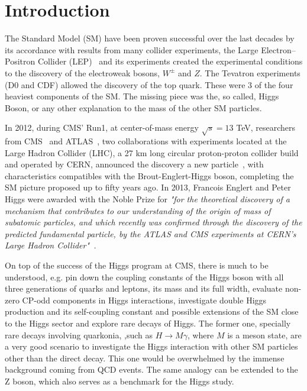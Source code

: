 \chapter{Introduction}

The Standard Model (SM) have been proven successful over the last decades by its accordance with results from many collider experiments, the Large Electron–Positron Collider (LEP)~\cite{lep_tdr} and its experiments created the experimental conditions to the discovery of the electroweak bosons, $W^{\pm}$ and $Z$. The Tevatron experiments (D0 and CDF) allowed the discovery of the top quark. These were 3 of the four heaviest components of the SM. The missing piece was the, so called, Higgs Boson, or any other explanation to the mass of the other SM particles. 

In 2012, during CMS' Run1, at center-of-mass energy $\sqrt{s} = 13$ TeV, researchers from CMS~\cite{Chatrchyan:2008zzk} and ATLAS~\cite{atlas_collaboration_2008}, two collaborations with experiments located at the Large Hadron Collider (LHC), a 27 km long circular proton-proton collider build and operated by CERN, announced the discovery a new particle~\cite{higgs_discovery_cms, higgs_discovery_atlas}, with characteristics compatibles with the Brout-Englert-Higgs boson, completing the SM picture proposed up to fifty years ago. In 2013, Francois Englert and Peter Higgs were awarded with the Noble Prize for \textit{"for the theoretical discovery of a mechanism that contributes to our understanding of the origin of mass of subatomic particles, and which recently was confirmed through the discovery of the predicted fundamental particle, by the ATLAS and CMS experiments at CERN's Large Hadron Collider"~\cite{noble_prize}.}

On top of the success of the Higgs program at CMS, there is much to be understood, e.g. pin down the coupling constants of the Higgs boson with all three generations of quarks and leptons, its mass and its full width, evaluate non-zero CP-odd components in Higgs interactions, investigate double Higgs production and its self-coupling constant and possible extensions of the SM close to the Higgs sector and explore rare decays of Higgs. The former one, specially rare decays involving quarkonia, ,such as $H \rightarrow M \gamma$, where $M$ is a meson state, are a very good scenario to investigate the Higgs interaction with other SM particles other than the direct decay. This one would be overwhelmed by the immense background coming from QCD events. The same analogy can be extended to the Z boson, which also serves as a benchmark for the Higgs study.

